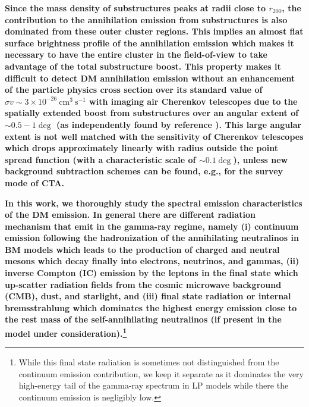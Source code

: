 \documentclass[10pt,aps,pra,reprint,amsmath,amsfonts,amssymb,showpacs,nofootinbib,floatfix]{revtex4-1}
\def\C#1{{\bf #1}}
\newcommand{\rvir}{r_{200}}
\begin{document}
\C{Since the mass density of substructures peaks at radii close to
  $\rvir$, the contribution to the annihilation emission from
  substructures is also dominated from these outer cluster regions.
  This implies an almost flat surface brightness profile of the
  annihilation emission which makes it necessary to have the entire
  cluster in the field-of-view to take advantage of the total
  substructure boost. This property makes it difficult to detect DM
  annihilation emission without an enhancement of the particle physics
  cross section over its standard value of $\sigma v\sim 3\times
  10^{-26} ~\mathrm{cm}^3~\mathrm{s}^{-1}$ with imaging air Cherenkov
  telescopes due to the spatially extended boost from substructures
  over an angular extent of $\sim 0.5-1\deg$ (as independently found
  by reference \cite{2011arXiv1104.3530S}). This large angular extent
  is not well matched with the sensitivity of Cherenkov telescopes
  which drops approximately linearly with radius outside the point
  spread function (with a characteristic scale of $\sim 0.1\deg$),
  unless new background subtraction schemes can be found, e.g., for
  the survey mode of CTA.}

\C{In this work, we thoroughly study the spectral emission
  characteristics of the DM emission. In general there are different
  radiation mechanism that emit in the gamma-ray regime, namely (i)
  continuum emission following the hadronization of the annihilating
  neutralinos in BM models which leads to the production of charged
  and neutral mesons which decay finally into electrons, neutrinos,
  and gammas, (ii) inverse Compton (IC) emission by the leptons in the
  final state which up-scatter radiation fields from the cosmic
  microwave background (CMB), dust, and starlight, and (iii) final
  state radiation or internal bremsstrahlung which dominates the
  highest energy emission close to the rest mass of the
  self-annihilating neutralinos (if present in the model under
  consideration).\footnote{While this final state radiation is
    sometimes not distinguished from the continuum emission
    contribution, we keep it separate as it dominates the very
    high-energy tail of the gamma-ray spectrum in LP models while
    there the continuum emission is negligibly low.}}
\end{document}
